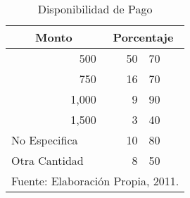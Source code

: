 \begin{table}[h!]
    \caption{Disponibilidad de Pago}
    \label{tbl:Encuesta:Pago}
    \centering
    \begin{tabular}{@{\$ }r@{.00}|r@{.}l@{\%}}
	    \multicolumn{1}{c|}{Monto} &
	    	\multicolumn{2}{c}{Porcentaje} \\
	    \hline
	    \hline
	    500                                & 50 & 70 \\
	    750                                & 16 & 70 \\
	    1,000                              &  9 & 90 \\
	    1,500                              &  3 & 40 \\
	    \multicolumn{1}{l|}{No Especifica} & 10 & 80 \\
	    \multicolumn{1}{l|}{Otra Cantidad} &  8 & 50 \\
	    \hline
	    \multicolumn{3}{l}{\footnotesize Fuente: Elaboración Propia, 2011.}
    \end{tabular}
\end{table}
